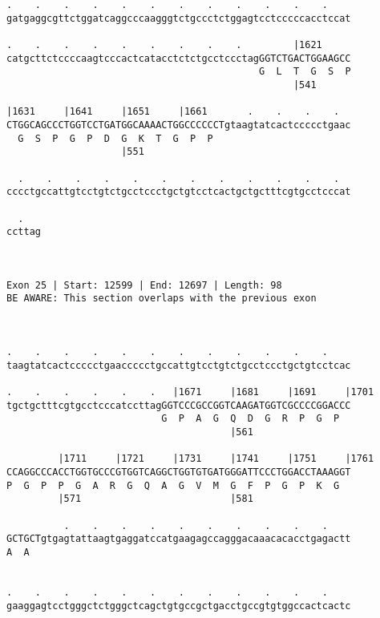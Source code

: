 \documentclass{article}
\begin{document}
\begin{Verbatim}
.    .    .    .    .    .    .    .    .    .    .    .    
gatgaggcgttctggatcaggcccaagggtctgccctctggagtcctcccccacctccat
                                                            
.    .    .    .    .    .    .    .    .         |1621     
catgcttctccccaagtcccactcatacctctctgcctccctagGGTCTGACTGGAAGCC
                                            G  L  T  G  S  P
                                                  |541      
  
|1631     |1641     |1651     |1661       .    .    .    .  
CTGGCAGCCCTGGTCCTGATGGCAAAACTGGCCCCCCTgtaagtatcactccccctgaac
  G  S  P  G  P  D  G  K  T  G  P  P                        
                    |551                                    
  
  .    .    .    .    .    .    .    .    .    .    .    .  
cccctgccattgtcctgtctgcctccctgctgtcctcactgctgctttcgtgcctcccat
                                                            
  .   
ccttag
      
      
 
Exon 25 | Start: 12599 | End: 12697 | Length: 98
BE AWARE: This section overlaps with the previous exon



.    .    .    .    .    .    .    .    .    .    .    .    
taagtatcactccccctgaaccccctgccattgtcctgtctgcctccctgctgtcctcac
                                                            
.    .    .    .    .    .   |1671     |1681     |1691     |1701
tgctgctttcgtgcctcccatccttagGGTCCCGCCGGTCAAGATGGTCGCCCCGGACCC
                           G  P  A  G  Q  D  G  R  P  G  P  
                                       |561                 
  
         |1711     |1721     |1731     |1741     |1751     |1761
CCAGGCCCACCTGGTGCCCGTGGTCAGGCTGGTGTGATGGGATTCCCTGGACCTAAAGGT
P  G  P  P  G  A  R  G  Q  A  G  V  M  G  F  P  G  P  K  G  
         |571                          |581                 
  
          .    .    .    .    .    .    .    .    .    .    
GCTGCTgtgagtattaagtgaggatccatgaagagccagggacaaacacacctgagactt
A  A                                                        
                                                            
  
.    .    .    .    .    .    .    .    .    .    .    .    
gaaggagtcctgggctctgggctcagctgtgccgctgacctgccgtgtggccactcactc
                                                            

\end{Verbatim}
\end{document}
